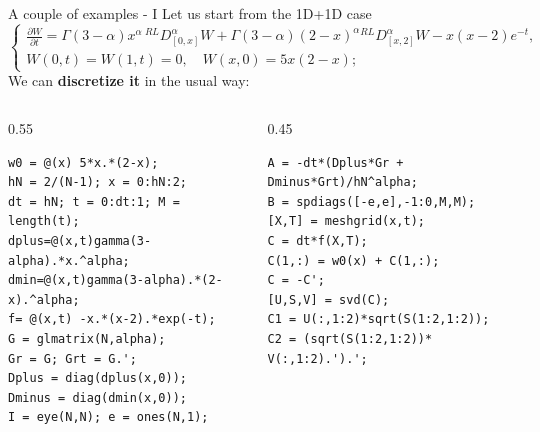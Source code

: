 \documentclass[aspectratio=169,xcolor=dvipsnames]{beamer}
\begin{document}
	\begin{frame}[fragile]{A couple of examples - I}
	Let us start from the 1D+1D case
	\[
	\begin{cases}
	\frac{\partial W}{\partial t} = \Gamma(3-\alpha) x^\alpha\, {}^{RL}D_{[0,x]}^\alpha W + \Gamma(3-\alpha) (2-x)^\alpha {}^{RL}D_{[x,2]}^\alpha W - x(x-2)e^{-t},\\
	W(0,t) = W(1,t) = 0, \quad W(x,0) = 5x(2-x);
	\end{cases}
	\]
	We can \textbf{discretize it} in the usual way:\vspace{-1em}
\begin{columns}
\begin{column}{0.55\columnwidth}
\begin{verbatim}
w0 = @(x) 5*x.*(2-x);
hN = 2/(N-1); x = 0:hN:2;
dt = hN; t = 0:dt:1; M = length(t);
dplus=@(x,t)gamma(3-alpha).*x.^alpha;
dmin=@(x,t)gamma(3-alpha).*(2-x).^alpha;
f= @(x,t) -x.*(x-2).*exp(-t);
G = glmatrix(N,alpha);
Gr = G; Grt = G.';
Dplus = diag(dplus(x,0));
Dminus = diag(dmin(x,0));
I = eye(N,N); e = ones(N,1);
\end{verbatim}
\end{column}
\begin{column}{0.45\columnwidth}
\begin{verbatim}
A = -dt*(Dplus*Gr + Dminus*Grt)/hN^alpha;
B = spdiags([-e,e],-1:0,M,M);
[X,T] = meshgrid(x,t);
C = dt*f(X,T);
C(1,:) = w0(x) + C(1,:);
C = -C';
[U,S,V] = svd(C);
C1 = U(:,1:2)*sqrt(S(1:2,1:2));
C2 = (sqrt(S(1:2,1:2))* V(:,1:2).').';
\end{verbatim}
\end{column}
\end{columns}

	\end{frame}
\end{document}
